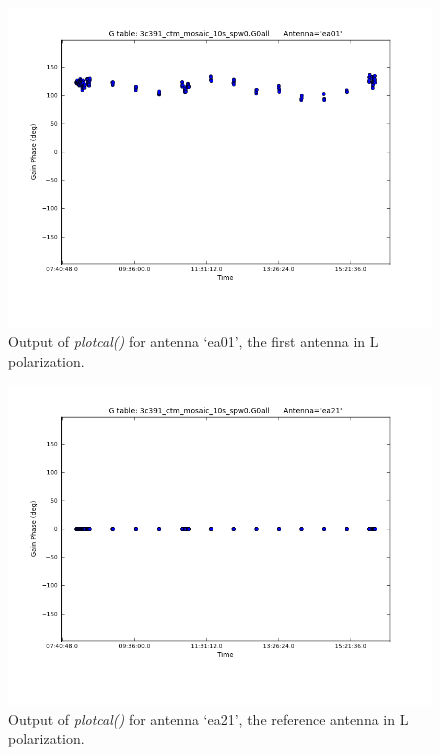 \documentclass[12pt, a4paper]{article}
\begin{document}
\begin{figure}[h!]
    \centering
    \includegraphics[scale=0.5]{../Imaging/plots2/phase_calibration_part4c_question5_ea01_pol-L.png}
    \caption{Output of \emph{plotcal()} for antenna `ea01', the first antenna in L polarization. \label{fig:part4subC2-1-L}}
\end{figure}

\begin{figure}[h!]
    \centering
    \includegraphics[scale=0.5]{../Imaging/plots2/phase_calibration_part4c_question5_ea21_pol-L.png}
    \caption{Output of \emph{plotcal()} for antenna `ea21', the reference antenna in L polarization. \label{fig:part4subC2-2-L}}
\end{figure}
\end{document}

